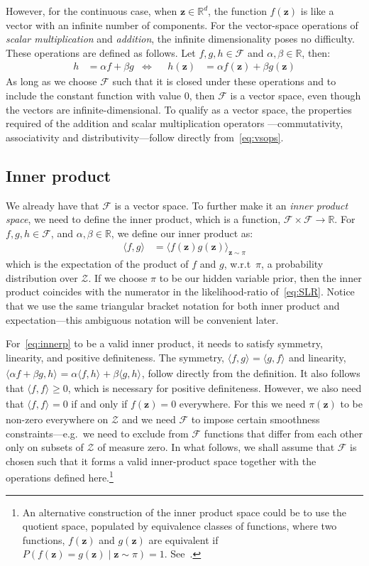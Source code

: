 \documentclass[a4paper,oneside,12pt,english]{report}
\def\zvec{\mathbf{z}}
\def\expv#1#2{\bigl\langle#1\bigr\rangle_{#2}}
\def\R{\mathbb{R}}
\def\Zset{\mathcal{Z}}
\def\Zset{\mathcal{Z}}
\def\Fset{\mathcal{F}}
\def\dot#1#2{\expv{#1,#2}{}}
\begin{document}
However, for the continuous case, when $\zvec\in\R^d$, the function $f(\zvec)$ is like a vector with an infinite number of components. For the vector-space operations of \emph{scalar multiplication} and \emph{addition}, the infinite dimensionality poses no difficulty. These operations are defined as follows. Let $f,g,h\in\Fset$ and $\alpha,\beta\in\R$, then:
\begin{align}
\label{eq:vsops}
h &= \alpha f + \beta g & \Leftrightarrow && h(\zvec) &= \alpha f(\zvec) + \beta g(\zvec)
\end{align} 
As long as we choose $\Fset$ such that it is closed under these operations and to include the constant function with value $0$, then $\Fset$ is a vector space, even though the vectors are infinite-dimensional. To qualify as a vector space, the properties required of the addition and scalar multiplication operators ---commutativity, associativity and distributivity---follow directly from~\eqref{eq:vsops}.

\subsection{Inner product}
We already have that $\Fset$ is a vector space. To further make it an \emph{inner product space}, we need to define the inner product, which is a function, $\Fset\times\Fset\to\R$. For $f,g,h\in\Fset$, and $\alpha,\beta\in\R$, we define our inner product as:
\begin{align}
\label{eq:innerp}
\dot{f}{g} &= \expv{f(\zvec)g(\zvec)}{\zvec\sim\pi}
\end{align}
which is the expectation of the product of $f$ and $g$, w.r.t\ $\pi$, a probability distribution over $\Zset$. If we choose $\pi$ to be our hidden variable prior, then the inner product coincides with the numerator in the likelihood-ratio of~\eqref{eq:SLR}. Notice that we use the same triangular bracket notation for both inner product and expectation---this ambiguous notation will be convenient later. 

For~\eqref{eq:innerp} to be a valid inner product, it needs to satisfy symmetry, linearity, and positive definiteness. The symmetry, $\dot{f}{g}=\dot{g}{f}$ and linearity, $\dot{\alpha f+\beta g}{h}=\alpha\dot{f}{h}+\beta\dot{g}{h}$, follow directly from the definition. It also follows that $\dot{f}{f}\ge0$, which is necessary for positive definiteness. However, we also need that $\dot{f}{f}=0$ if and only if $f(\zvec)=0$ everywhere. For this we need $\pi(\zvec)$ to be non-zero everywhere on $\Zset$ and we need $\Fset$ to impose certain smoothness constraints---e.g.\ we need to exclude from $\Fset$ functions that differ from each other only on subsets of $\Zset$ of measure zero. In what follows, we shall assume that $\Fset$ is chosen such that it forms a valid inner-product space together with the operations defined here.\footnote{An alternative construction of the inner product space could be to use the quotient space, populated by equivalence classes of functions, where two functions, $f(\zvec)$ and $g(\zvec)$ are equivalent if $P(f(\zvec)=g(\zvec)\mid \zvec\sim\pi)=1$. See~\cite{random}.}
\end{document}
